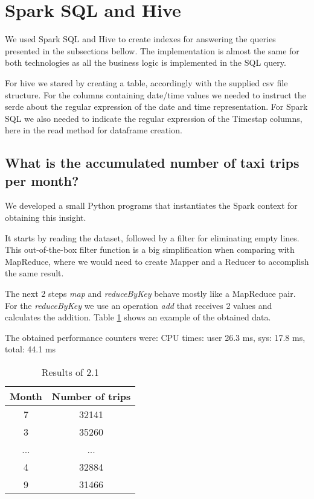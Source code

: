 \documentclass[conference,compsoc]{IEEEtran}
\begin{document}
\section{Spark SQL and Hive}
We used Spark SQL and Hive to create indexes for answering the queries presented in the subsections bellow. The implementation is almost the same for both technologies as all the business logic is implemented in the SQL query.

For hive we stared by creating a table, accordingly with the supplied csv file structure. For the columns containing date/time values we needed to instruct the serde about the regular expression of the date and time representation. For Spark SQL we also needed to indicate the regular expression of the Timestap columns, here in the read method for dataframe creation.

\subsection{What is the accumulated number of taxi trips per month?}
We developed a small Python programs that instantiates the Spark context for obtaining this insight.\par It starts by reading the dataset,  followed by a filter for eliminating empty lines. This out-of-the-box filter function is a big simplification when comparing with MapReduce, where we would need to create Mapper and a Reducer to accomplish the same result.  \par
The next 2 steps \textit{map} and \textit{reduceByKey} behave mostly like a MapReduce pair. For the \textit{reduceByKey} we use an operation \textit{add} that receives 2 values and calculates the addition. Table \ref{output_2_1} shows an example of the obtained data.
\par
The obtained performance counters were: CPU times: user 26.3 ms, sys: 17.8 ms, total: 44.1 ms


\begin{table}[!t]
\renewcommand{\arraystretch}{1.3}
\caption{Results of 2.1}
\label{output_2_1}
\centering
\begin{tabular}{c||c}
\hline
\bfseries Month & \bfseries Number of trips\\
\hline\hline

7 &32141\\
3 &35260\\
... & ...\\
4 &32884\\
9 &31466\\
\hline
\end{tabular}
\end{table}
\end{document}
